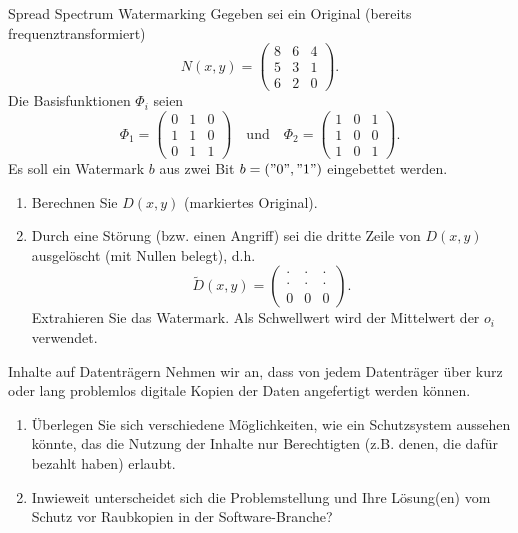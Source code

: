 \documentclass{article}
\author{Leopold Lemmermann}
\begin{document}
\createtitle

\setcounter{section}{20}
\begin{exercise}[3]{Spread Spectrum Watermarking}
  Gegeben sei ein Original (bereits frequenztransformiert)
  \[
    N(x,y)=\begin{pmatrix} 8 & 6 & 4 \\ 5 & 3 & 1\\ 6 & 2 & 0 \end{pmatrix}.
  \]
  Die Basisfunktionen $\Phi_i$ seien
  \[
    \Phi_1=\begin{pmatrix} 0 & 1 & 0 \\ 1 & 1 & 0 \\ 0 & 1 & 1 \end{pmatrix} \quad \text{und} \quad \Phi_2=\begin{pmatrix} 1 & 0 & 1 \\ 1 & 0 & 0 \\ 1 & 0 & 1 \end{pmatrix}.
  \]
  Es soll ein Watermark $b$ aus zwei Bit $b = ("0","1")$ eingebettet werden.

  \begin{enumerate}
    \item Berechnen Sie $D(x,y)$ (markiertes Original).
    \item Durch eine Störung (bzw. einen Angriff) sei die dritte Zeile von $D(x,y)$ ausgelöscht (mit Nullen belegt), d.h.
          \[
            \tilde{D}(x,y)=\begin{pmatrix} \cdot & \cdot & \cdot \\ \cdot & \cdot & \cdot \\ 0 & 0 & 0 \end{pmatrix}.
          \]
          Extrahieren Sie das Watermark. Als Schwellwert wird der Mittelwert der $o_i$ verwendet.
  \end{enumerate}
\end{exercise}

\setcounter{section}{25}
\begin{exercise}[1]{Inhalte auf Datenträgern}
  Nehmen wir an, dass von jedem Datenträger über kurz oder lang problemlos digitale Kopien der Daten angefertigt werden können.
  \begin{enumerate}
    \item Überlegen Sie sich verschiedene Möglichkeiten, wie ein Schutzsystem aussehen könnte, das die Nutzung der Inhalte nur Berechtigten (z.B. denen, die dafür bezahlt haben) erlaubt.
    \item Inwieweit unterscheidet sich die Problemstellung und Ihre Lösung(en) vom Schutz vor Raubkopien in der Software-Branche?
  \end{enumerate}
\end{exercise}
\end{document}
